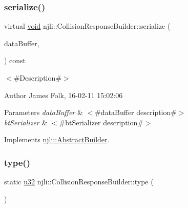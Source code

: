 \subsubsection{\texorpdfstring{serialize()}{serialize()}}
{\footnotesize\ttfamily virtual \mbox{\hyperlink{_thread_8h_af1e856da2e658414cb2456cb6f7ebc66}{void}} njli\+::\+Collision\+Response\+Builder\+::serialize (\begin{DoxyParamCaption}\item[{\mbox{\hyperlink{_thread_8h_af1e856da2e658414cb2456cb6f7ebc66}{void}} $\ast$}]{data\+Buffer,  }\item[{bt\+Serializer $\ast$}]{ }\end{DoxyParamCaption}) const\hspace{0.3cm}{\ttfamily [virtual]}}



$<$\#\+Description\#$>$ 

\begin{DoxyAuthor}{Author}
James Folk, 16-\/02-\/11 15\+:02\+:06
\end{DoxyAuthor}

\begin{DoxyParams}{Parameters}
{\em data\+Buffer} & $<$\#data\+Buffer description\#$>$ \\
\hline
{\em bt\+Serializer} & $<$\#bt\+Serializer description\#$>$ \\
\hline
\end{DoxyParams}


Implements \mbox{\hyperlink{classnjli_1_1_abstract_builder_ab66b774e02ccb9da554c9aab7fa6d981}{njli\+::\+Abstract\+Builder}}.

\mbox{\label{classnjli_1_1_collision_response_builder_adc227ba24772b6efb0591ede596ea0c2}} 
\subsubsection{\texorpdfstring{type()}{type()}}
{\footnotesize\ttfamily static \mbox{\hyperlink{_util_8h_a10e94b422ef0c20dcdec20d31a1f5049}{u32}} njli\+::\+Collision\+Response\+Builder\+::type (\begin{DoxyParamCaption}{ }\end{DoxyParamCaption})\hspace{0.3cm}{\ttfamily [static]}}

